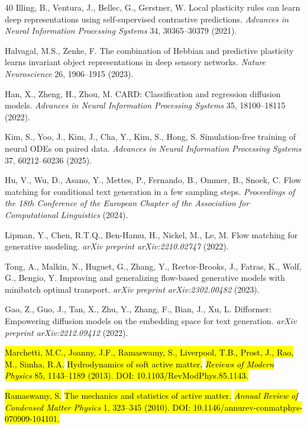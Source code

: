 \documentclass[preprint,12pt]{elsarticle}
\newcommand{\rev}[1]{\hl{#1}}
\begin{document}
\begin{thebibliography}{40}
Illing, B., Ventura, J., Bellec, G., Gerstner, W. 
Local plasticity rules can learn deep representations using self-supervised contrastive predictions. 
\textit{Advances in Neural Information Processing Systems} 34, 30365--30379 (2021).

Halvagal, M.S., Zenke, F. 
The combination of Hebbian and predictive plasticity learns invariant object representations in deep sensory networks. 
\textit{Nature Neuroscience} 26, 1906--1915 (2023).

Han, X., Zheng, H., Zhou, M. 
CARD: Classification and regression diffusion models. 
\textit{Advances in Neural Information Processing Systems} 35, 18100--18115 (2022).

Kim, S., Yoo, J., Kim, J., Cha, Y., Kim, S., Hong, S. 
Simulation-free training of neural ODEs on paired data. 
\textit{Advances in Neural Information Processing Systems} 37, 60212--60236 (2025).

Hu, V., Wu, D., Asano, Y., Mettes, P., Fernando, B., Ommer, B., Snoek, C. 
Flow matching for conditional text generation in a few sampling steps. 
\textit{Proceedings of the 18th Conference of the European Chapter of the Association for Computational Linguistics} (2024).

Lipman, Y., Chen, R.T.Q., Ben-Hamu, H., Nickel, M., Le, M. 
Flow matching for generative modeling. 
\textit{arXiv preprint arXiv:2210.02747} (2022).

Tong, A., Malkin, N., Huguet, G., Zhang, Y., Rector-Brooks, J., Fatras, K., Wolf, G., Bengio, Y. 
Improving and generalizing flow-based generative models with minibatch optimal transport. 
\textit{arXiv preprint arXiv:2302.00482} (2023).

Gao, Z., Guo, J., Tan, X., Zhu, Y., Zhang, F., Bian, J., Xu, L. 
Difformer: Empowering diffusion models on the embedding space for text generation. 
\textit{arXiv preprint arXiv:2212.09412} (2022).

\rev{Marchetti, M.C., Joanny, J.F., Ramaswamy, S., Liverpool, T.B., Prost, J., Rao, M., Simha, R.A.}
\rev{Hydrodynamics of soft active matter.}
\rev{\textit{Reviews of Modern Physics} 85, 1143--1189 (2013). DOI: 10.1103/RevModPhys.85.1143.}

\rev{Ramaswamy, S.}
\rev{The mechanics and statistics of active matter.}
\rev{\textit{Annual Review of Condensed Matter Physics} 1, 323--345 (2010). DOI: 10.1146/annurev-conmatphys-070909-104101.}


\end{thebibliography}
\end{document}
